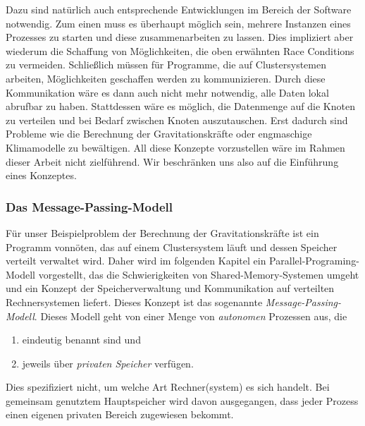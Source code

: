       Dazu sind natürlich auch entsprechende Entwicklungen im Bereich der Software notwendig. Zum einen muss es überhaupt möglich sein, mehrere Instanzen eines 
      Prozesses zu starten und diese zusammenarbeiten zu lassen. Dies impliziert aber wiederum die Schaffung von Möglichkeiten, die oben erwähnten Race Conditions zu vermeiden. Schließlich 
      müssen für Programme, die auf Clustersystemen arbeiten, Möglichkeiten geschaffen werden zu kommunizieren. Durch diese Kommunikation wäre es dann auch nicht mehr notwendig, alle Daten
      lokal abrufbar zu haben. Stattdessen wäre es möglich, die Datenmenge auf die Knoten zu verteilen und bei Bedarf zwischen Knoten auszutauschen. Erst dadurch sind Probleme wie die 
      Berechnung der Gravitationskräfte oder engmaschige Klimamodelle zu bewältigen.
      All diese Konzepte vorzustellen wäre im Rahmen dieser Arbeit nicht zielführend. Wir beschränken uns also auf die Einführung eines Konzeptes.
      
      \subsubsection{Das Message-Passing-Modell}
      \label{sec:mpm}
      Für unser Beispielproblem der Berechnung der Gravitationskräfte ist ein Programm vonnöten, das auf einem Clustersystem läuft und dessen Speicher verteilt verwaltet wird.
      Daher wird im folgenden Kapitel ein Parallel-Programing-Modell vorgestellt, das die Schwierigkeiten von Shared-Memory-Systemen umgeht und ein Konzept der Speicherverwaltung 
      und Kommunikation auf verteilten Rechnersystemen liefert.
      Dieses Konzept ist das sogenannte \textit{Message-Passing-Modell}. 
      Dieses Modell geht von einer Menge von \textit{autonomen} Prozessen aus, die
      \begin{enumerate}
       \item eindeutig benannt sind und
       \item jeweils über \textit{privaten Speicher} verfügen.
      \end{enumerate}
      Dies spezifiziert nicht, um welche Art Rechner(system) es sich handelt. Bei gemeinsam genutztem Hauptspeicher wird davon ausgegangen, dass jeder Prozess einen eigenen privaten 
      Bereich zugewiesen bekommt.
      
